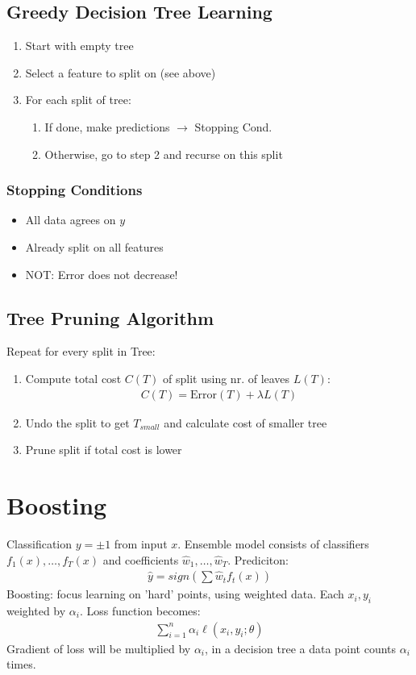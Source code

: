 \documentclass[8pt, a4paper, landscape, includeheadfoot]{extarticle}
\begin{document}
\begin{multicols*}{4}
	\subsection{Greedy Decision Tree Learning}
	\begin{enumerate}[itemsep=0pt]
		\item Start with empty tree
		\item Select a feature to split on (see above)
		\item For each split of tree:
		      \begin{enumerate}[itemsep=0pt]
			      \item If done, make predictions $\rightarrow$ Stopping Cond.
			      \item Otherwise, go to step 2 and recurse on this split
		      \end{enumerate}
	\end{enumerate}

	\subsubsection{Stopping Conditions}{}
	\begin{itemize}[itemsep=0pt]
		\item All data agrees on $y$
		\item Already split on all features
		\item NOT: Error does not decrease!
	\end{itemize}

	\subsection{Tree Pruning Algorithm}
	Repeat for every split in Tree:
	\begin{enumerate}[itemsep=0pt]
		\item Compute total cost $C(T)$ of split using nr. of leaves $L(T)$:
		      \begin{align*}
			      C(T) = \text{Error}(T) + \lambda L(T)
		      \end{align*}
		\item Undo the split to get $T_{small}$ and calculate cost of smaller tree
		\item Prune split if total cost is lower
	\end{enumerate}
	\section{Boosting}
	Classification $y = \pm 1$ from input $x$. Ensemble model consists of classifiers $f_1(x), \dots, f_T(x)$ and coefficients $\hat{w}_1, \dots, \hat{w}_T$. Prediciton:
	\begin{align}
		\hat{y} = sign\left(\sum \hat{w}_t f_t(x)\right)
	\end{align}
	Boosting: focus learning on 'hard' points, using weighted data. Each $x_i, y_i$ weighted by $\alpha_i$. Loss function becomes:
	\begin{align*}
		\sum_{i=1}^{n}\alpha_i\ell(x_i, y_i; \theta)
	\end{align*}
	Gradient of loss will be multiplied by $\alpha_i$, in a decision tree a data point counts $\alpha_i$ times.

\end{multicols*}
\end{document}
